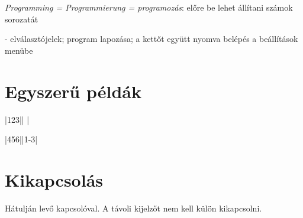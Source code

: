 \documentclass{article}
\begin{document}
 \emph{Programming = Programmierung = programozás}: előre be lehet állítani számok sorozatát

\keys{{+}}-\keys{{-}} elválasztójelek; program lapozása; a kettőt együtt nyomva belépés a beállítások menübe

\section*{Egyszerű példák}

   \keys{ } \dotfill {}|123||   |

     \keys{-}  \keys{ } \dotfill {}|456||1-3|

\section*{Kikapcsolás}

Hátulján levő kapcsolóval. A távoli kijelzőt nem kell külön kikapcsolni.


\end{document}
